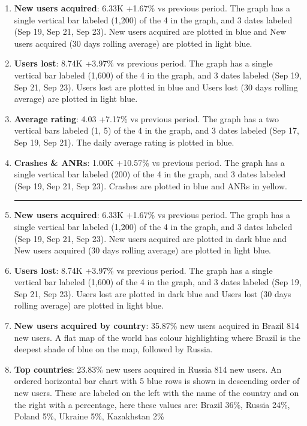\begin{enumerate}
    \item \textbf{New users acquired}: 6.33K +1.67\% vs previous period. The graph has a single vertical bar labeled (1,200) of the 4 in the graph, and 3 dates labeled (Sep 19, Sep 21, Sep 23). New users acquired are plotted in blue and New users acquired (30 days rolling average) are plotted in light blue.
    \item \textbf{Users lost}: 8.74K +3.97\% vs previous period. The graph has a single vertical bar labeled (1,600) of the 4 in the graph, and 3 dates labeled (Sep 19, Sep 21, Sep 23). Users lost are plotted in blue and Users lost (30 days rolling average) are plotted in light blue.
    \item \textbf{Average rating}: 4.03 +7.17\% vs previous period. The graph has a two vertical bars labeled (1, 5) of the 4 in the graph, and 3 dates labeled (Sep 17, Sep 19, Sep 21). The daily average rating is plotted in blue.
    \item \textbf{Crashes \& ANRs}: 1.00K +10.57\% vs previous period. The graph has a single vertical bar labeled (200) of the 4 in the graph, and 3 dates labeled (Sep 19, Sep 21, Sep 23). Crashes are plotted in blue and ANRs in yellow.

    \vspace{0.2cm}
    \hrule
    \vspace{0.3cm}
      
    \item \textbf{New users acquired}: 6.33K +1.67\% vs previous period. The graph has a single vertical bar labeled (1,200) of the 4 in the graph, and 3 dates labeled (Sep 19, Sep 21, Sep 23). New users acquired are plotted in dark blue and New users acquired (30 days rolling average) are plotted in light blue.
    \item \textbf{Users lost}: 8.74K +3.97\% vs previous period. The graph has a single vertical bar labeled (1,600) of the 4 in the graph, and 3 dates labeled (Sep 19, Sep 21, Sep 23). Users lost are plotted in dark blue and Users lost (30 days rolling average) are plotted in light blue.
    \item \textbf{New users acquired by country}: 35.87\% new users acquired in Brazil 814 new users. A flat map of the world has colour highlighting where Brazil is the deepest shade of blue on the map, followed by Russia.
    \item \textbf{Top countries}: 23.83\% new users acquired in Russia 814 new users. An ordered horizontal bar chart with 5 blue rows is shown in descending order of new users. These are labeled on the left with the name of the country and on the right with a percentage, here these values are: Brazil 36\%, Russia 24\%, Poland 5\%, Ukraine 5\%, Kazakhstan 2\%
    

\end{enumerate}

